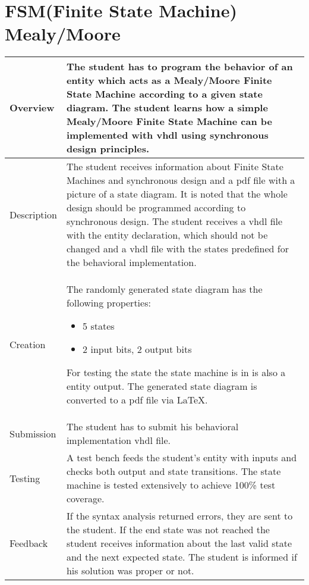 \section{FSM(Finite State Machine) Mealy/Moore}\label{finitestatemachine}
    \begin{tabular}{|p{2cm}|p{11cm}|}
        \hline
        Overview & The student has to program the behavior of an entity which acts as a Mealy/Moore Finite
        State Machine according to a given state diagram. The student learns how a simple Mealy/Moore Finite
        State Machine can be implemented with vhdl using synchronous design principles.
        \\
        \hline
        Description & The student receives information about Finite State Machines and synchronous
        design and a pdf file with a picture of a state diagram. It is noted that the whole design should be
        programmed according to synchronous design. The student receives a vhdl file with the
        entity declaration, which should not be changed and a vhdl file with the states predefined
        for the behavioral implementation.
        \\
        \hline
        Creation &  The randomly generated state diagram has the following properties:
        \begin{itemize}
            \item 5 states
            \item 2 input bits, 2 output bits
        \end{itemize}
        For testing the state the state machine is in is also a entity output. The generated state diagram
        is converted to a pdf file via \LaTeX.
        \\
        \hline
        Submission & The student has to submit his behavioral implementation vhdl file.
        \\
        \hline
        Testing & A test bench feeds the student's entity with inputs and checks both output and state
        transitions. The state machine is tested extensively to achieve 100\% test coverage.
        \\
        \hline
        Feedback & If the syntax analysis returned errors, they are sent to the student. If the end
        state was not reached the student receives information about the last valid state and the next
        expected state. The student is informed if his solution was proper or not.
        \\
        \hline
    \end{tabular}


